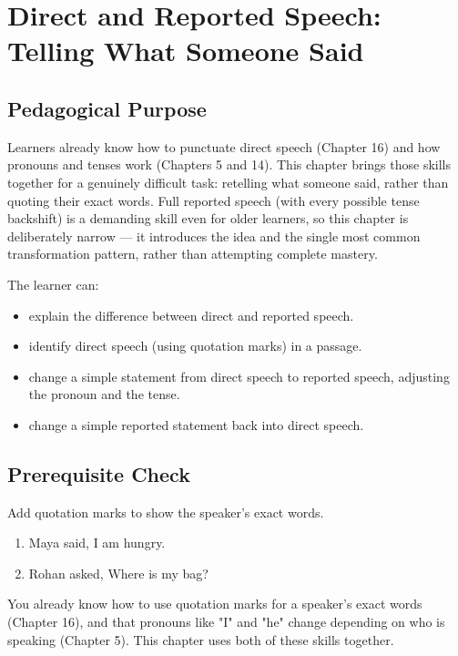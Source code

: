 
\chapter{Direct and Reported Speech: Telling What Someone Said}

\section{Pedagogical Purpose}
Learners already know how to punctuate direct speech (Chapter 16) and how pronouns and tenses work (Chapters 5 and 14). This chapter brings those skills together for a genuinely difficult task: retelling what someone said, rather than quoting their exact words. Full reported speech (with every possible tense backshift) is a demanding skill even for older learners, so this chapter is deliberately narrow — it introduces the idea and the single most common transformation pattern, rather than attempting complete mastery.

\begin{learningobjectives}
The learner can:
\begin{itemize}
    \item explain the difference between direct and reported speech.
    \item identify direct speech (using quotation marks) in a passage.
    \item change a simple statement from direct speech to reported speech, adjusting the pronoun and the tense.
    \item change a simple reported statement back into direct speech.
\end{itemize}
\end{learningobjectives}

\section{Prerequisite Check}
\begin{quickcheck}
Add quotation marks to show the speaker's exact words.
\begin{enumerate}
    \item Maya said, I am hungry.
    \item Rohan asked, Where is my bag?
\end{enumerate}
\end{quickcheck}

\begin{rememberbox}
You already know how to use quotation marks for a speaker's exact words (Chapter 16), and that pronouns like "I" and "he" change depending on who is speaking (Chapter 5). This chapter uses both of these skills together.
\end{rememberbox}

